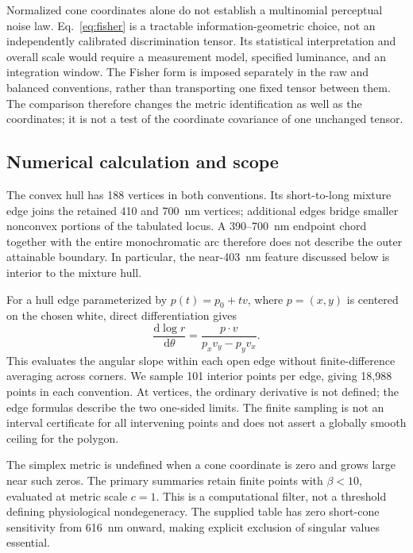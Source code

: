 \documentclass[11pt,letterpaper]{article}
\theoremstyle{plain}
\newcommand{\dd}{\mathrm{d}}
\begin{document}
Normalized cone coordinates alone do not establish a multinomial perceptual noise law. Eq.~\eqref{eq:fisher} is a tractable information-geometric choice, not an independently calibrated discrimination tensor. Its statistical interpretation and overall scale would require a measurement model, specified luminance, and an integration window. The Fisher form is imposed separately in the raw and balanced conventions, rather than transporting one fixed tensor between them. The comparison therefore changes the metric identification as well as the coordinates; it is not a test of the coordinate covariance of one unchanged tensor.

\subsection{Numerical calculation and scope}
The convex hull has 188 vertices in both conventions. Its short-to-long mixture edge joins the retained 410 and 700~nm vertices; additional edges bridge smaller nonconvex portions of the tabulated locus. A 390--700~nm endpoint chord together with the entire monochromatic arc therefore does not describe the outer attainable boundary. In particular, the near-403~nm feature discussed below is interior to the mixture hull.

For a hull edge parameterized by $p(t)=p_0+tv$, where $p=(x,y)$ is centered on the chosen white, direct differentiation gives
\begin{equation}
 \frac{\dd\log r}{\dd\theta}
 =\frac{p\mathbin{\cdot}v}{p_xv_y-p_yv_x}.
 \label{eq:edge-derivative}
\end{equation}
This evaluates the angular slope within each open edge without finite-difference averaging across corners. We sample 101 interior points per edge, giving 18,988 points in each convention. At vertices, the ordinary derivative is not defined; the edge formulas describe the two one-sided limits. The finite sampling is not an interval certificate for all intervening points and does not assert a globally smooth ceiling for the polygon.

The simplex metric is undefined when a cone coordinate is zero and grows large near such zeros. The primary summaries retain finite points with $\beta<10$, evaluated at metric scale $c=1$. This is a computational filter, not a threshold defining physiological nondegeneracy. The supplied table has zero short-cone sensitivity from 616~nm onward, making explicit exclusion of singular values essential.
\end{document}
